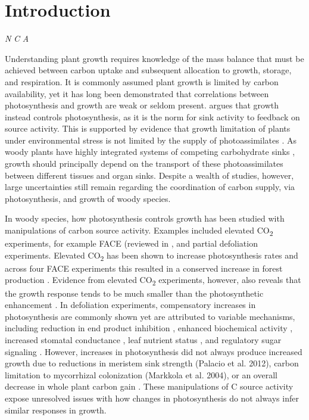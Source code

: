 \documentclass[a4paper]{article}\usepackage[]{graphicx}\usepackage[]{color}
\begin{document}
\section*{Introduction}

\textit{N}
\textit{C}
 \citep{korner2006plant, fourcaud2008plant}
\textit{A}


Understanding plant growth requires knowledge of the mass balance that must be achieved between carbon uptake and subsequent allocation to growth, storage, and respiration. It is commonly assumed plant growth is limited by carbon availability, yet it has long been demonstrated that correlations between photosynthesis and growth are weak or seldom present. \citet{korner2013growth} argues that growth instead controls photosynthesis, as it is the norm for sink activity to feedback on source activity. This is supported by evidence that growth limitation of plants under environmental stress is not limited by the supply of photoassimilates \citep{palacio2014does}. As woody plants have highly integrated systems of competing carbohydrate sinks \citep{kozlowski1992carbohydrate}, growth should principally depend on the transport of these photoassimilates between different tissues and organ sinks. Despite a wealth of studies, however, large uncertainties still remain regarding the coordination of carbon supply, via photosynthesis, and growth of woody species.

In woody species, how photosynthesis controls growth has been studied with manipulations of carbon source activity. Examples included elevated CO\textsubscript{2} experiments, for example FACE (reviewed in  \citet{ainsworth2005have}, and partial defoliation experiments. Elevated CO\textsubscript{2} has been shown to increase photosynthesis rates \citep{drake1997more,ainsworth2007response} and across four FACE experiments this resulted in a conserved increase in forest production \citep{norby2005forest}. Evidence from elevated CO\textsubscript{2} experiments, however, also reveals that the growth response tends to be much smaller than the photosynthetic enhancement \citep{kirschbaum2011does}. In defoliation experiments, compensatory increases in photosynthesis are commonly shown yet are attributed to variable mechanisms, including reduction in end product inhibition \citep{iglesias2002regulation,zhou2003changes,handa2005test}, enhanced biochemical activity \citep{ovaska1993b,layne1995end}, increased stomatal conductance \citep{layne1995end}, leaf nutrient status \citep{turnbull2007increased}, and regulatory sugar signaling \citep{eyles2013whole}. However, increases in photosynthesis did not always produce increased growth due to reductions in meristem sink strength (Palacio et al. 2012), carbon limitation to mycorrhizal colonization (Markkola et al. 2004), or an overall decrease in whole plant carbon gain \citep{ovaska1993a}. These manipulations of C source activity expose unresolved issues with how changes in photosynthesis do not always infer similar responses in growth.
\end{document}
